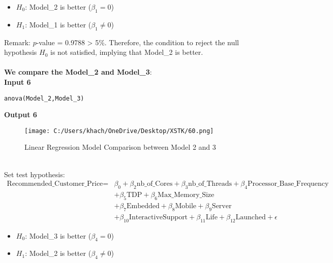 \documentclass[a4paper]{article}
\begin{document}
	\begin{itemize}
		\item $H_0$: Model\_2 is better ($\beta_1 = 0$)
		\item $H_1$: Model\_1 is better ($\beta_1 \neq 0$)
	\end{itemize}
	
	Remark:
	$p$-value = 0.9788 > 5\%. Therefore, the condition to reject the null hypothesis $H_0$ is not satisfied, implying that Model\_2 is better.\\
	\\
	\textbf{We compare the Model\_2 and Model\_3}:\\
	\textbf{Input 6}
	\begin{lstlisting}[frame=single, backgroundcolor=\color{gray!10}, breaklines=true, columns=fullflexible]
	anova(Model_2,Model_3)
	\end{lstlisting}
	\textbf{Output 6}
	\begin{figure}[htbp]
		\centering
		\begin{adjustbox}{width=0.7\textwidth, frame}
			\texttt{[image: C:/Users/khach/OneDrive/Desktop/XSTK/60.png]}
		\end{adjustbox}
		\captionsetup{justification=centering}
		\vspace{0.5cm}
		\caption{Linear Regression Model Comparison between Model 2 and 3}
	\end{figure}
	\\Set test hypothesis:
	\begin{align*}
		\text{Recommended\_Customer\_Price} = & \beta_0 + \beta_2 \text{nb\_of\_Cores} + \beta_3 \text{nb\_of\_Threads} + \beta_4 \text{Processor\_Base\_Frequency} \\
		& + \beta_5 \text{TDP} + \beta_6 \text{Max\_Memory\_Size} \\
		& + \beta_7 \text{Embedded} + \beta_8 \text{Mobile} + \beta_9 \text{Server} \\
		& + \beta_{10} \text{InteractiveSupport} + \beta_{11} \text{Life} + \beta_{12} \text{Launched} + \epsilon
	\end{align*}
	\begin{itemize}
		\item $H_0$: Model\_3 is better ($\beta_4 = 0$)
		\item $H_1$: Model\_2 is better ($\beta_4 \neq 0$)
	\end{itemize}
	
\end{document}
